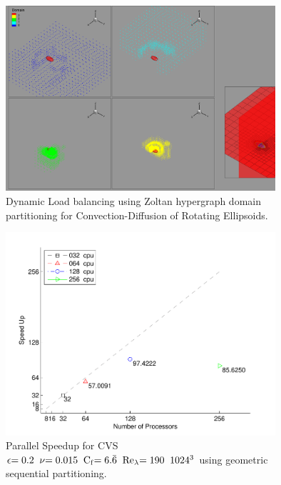 \begin{itemize}
{\begin{figure}
  \begin{center}
     \includegraphics[width=10cm]{figures/domain_2.png}
  \end{center}
  \caption{ Dynamic Load balancing using Zoltan hypergraph domain partitioning for Convection-Diffusion of Rotating Ellipsoids.}
  \label{fig:ExamplePartitioning}
\end{figure}

\begin{figure}
\centerline{
\includegraphics[width=10cm]{figures/SpeedUp_TimeIntegration_600.pdf}}
\caption{Parallel Speedup for CVS $\epsilon\rm{=0.2} \;\; \nu\rm{=0.015} \;\; C_f\rm{=6.\bar{6}} \;\; Re_{\lambda}\rm{=190} \;\; 1024^3$
         using geometric sequential partitioning.}
\label{fig:speedup}
\end{figure}

%
%





}
\end{itemize}
